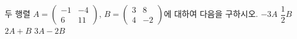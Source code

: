 두 행렬 $A=\begin{pmatrix} -1 & -4 \\ 6 & 11 \end{pmatrix}$, $B=\begin{pmatrix} 3 & 8 \\ 4 & -2 \end{pmatrix}$에 대하여 다음을 구하시오.
 $-3A$
 $\dfrac{1}{2}B$
 $2A+B$
 $3A-2B$
